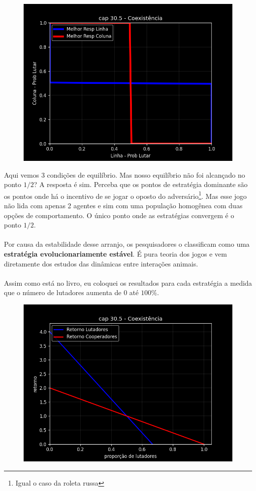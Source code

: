 \documentclass[a4paper,11pt,oneside]{book}
\theoremstyle{definition}
\theoremstyle{break}
\begin{document}
\begin{figure}[H]
\centering
\includegraphics[scale=0.75]{cap30_5-coexistencia_1.png}
\end{figure}

Aqui vemos 3 condições de equilíbrio. Mas nosso equilíbrio não foi alcançado no ponto $1/2$? A resposta é sim. Perceba que os pontos de estratégia dominante são os pontos onde há o incentivo de se jogar o oposto do adversário\footnote{Igual o caso da roleta russa}. Mas esse jogo não lida com apenas 2 agentes e sim com uma população homogênea com duas opções de comportamento. O único ponto onde as estratégias convergem é o ponto $1/2$.
\\
\\
Por causa da estabilidade desse arranjo, os pesquisadores o classificam como uma \textbf{estratégia evolucionariamente estável}. É pura teoria dos jogos e vem diretamente dos estudos das dinâmicas entre interações animais.
\\
\\
Assim como está no livro, eu coloquei os resultados para cada estratégia a medida que o número de lutadores aumenta de $0$ até $100\%$.

\begin{figure}[H]
\centering
\includegraphics[scale=0.75]{cap30_5-coexistencia_2.png}
\end{figure}
\end{document}
